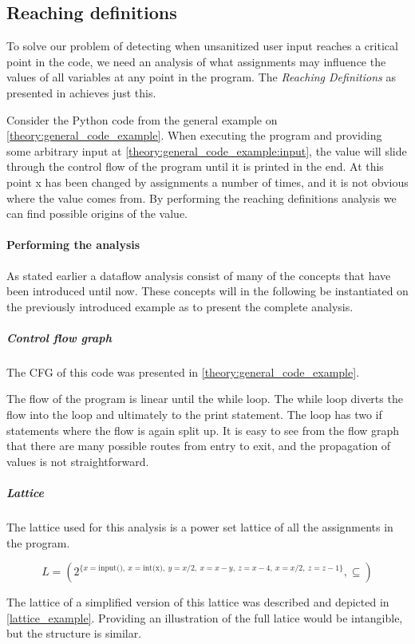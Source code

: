 \subsection{Reaching definitions}
To solve our problem of detecting when unsanitized user input reaches a critical point in the code, we need an analysis of what assignments may influence the values of all variables at any point in the program.
The \emph{Reaching Definitions} as presented in \citet[p.~26]{schwartzbach} achieves just this.

Consider the Python code from the general example on \cref{theory:general_code_example}.
When executing the program and providing some arbitrary input at \cref{theory:general_code_example:input}, the value will slide through the control flow of the program until it is printed in the end.
At this point x has been changed by assignments a number of times, and it is not obvious where the value comes from.
By performing the reaching definitions analysis we can find possible origins of the value.

\paragraph{Performing the analysis}
As stated earlier a dataflow analysis consist of many of the concepts that have been introduced until now.
These concepts will in the following be instantiated on the previously introduced example as to present the complete analysis.

\subparagraph{Control flow graph}
The CFG of this code was presented in \cref{theory:general_code_example}.

The flow of the program is linear until the while loop.
The while loop diverts the flow into the loop and ultimately to the print statement.
The loop has two if statements where the flow is again split up.
It is easy to see from the flow graph that there are many possible routes from entry to exit, and the propagation of values is not straightforward.

\subparagraph{Lattice}
The lattice used for this analysis is a power set lattice of all the assignments in the program.

\[ L = ( 2^{ \{x = \text{input()}, ~ x = \text{int(x)}, ~ y = x/2, ~ x = x-y, ~ z = x-4, ~ x = x/2, ~ z = z-1 \} } , \subseteq ) \]

The lattice of a simplified version of this lattice was described and depicted in \cref{lattice_example}.
Providing an illustration of the full latice would be intangible, but the structure is similar.

